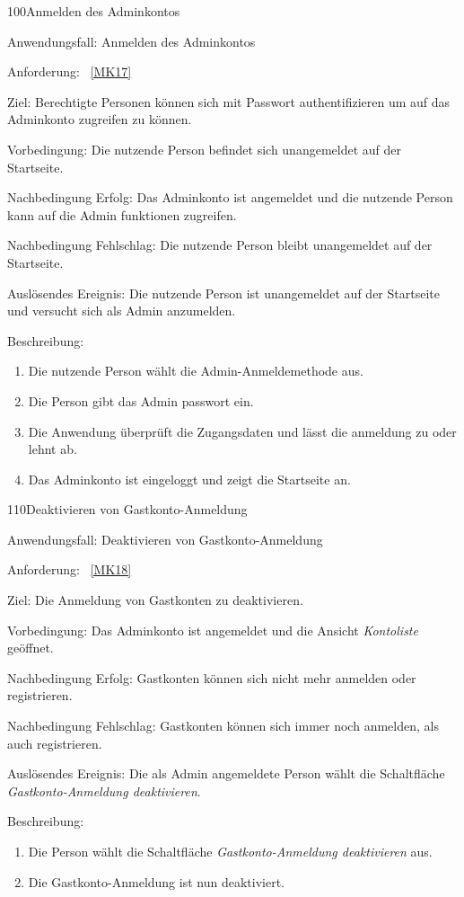 \begin{function}{100}{Anmelden des Adminkontos}
    \item[Anwendungsfall:] Anmelden des Adminkontos
    \item[Anforderung:]~\ref{MK17}
    \item[Ziel:] Berechtigte Personen können sich mit Passwort authentifizieren um auf das Adminkonto zugreifen zu können.
    \item[Vorbedingung:] Die nutzende Person befindet sich unangemeldet auf der Startseite.
    \item[Nachbedingung Erfolg:] Das Adminkonto ist angemeldet und die nutzende Person kann auf die Admin funktionen zugreifen.
    \item[Nachbedingung Fehlschlag:] Die nutzende Person bleibt unangemeldet auf der Startseite.
    \item[Auslösendes Ereignis:] Die nutzende Person ist unangemeldet auf der Startseite und versucht sich als Admin anzumelden.
    \item[Beschreibung:] ~
    \begin{enumerate}
        \item Die nutzende Person wählt die Admin-Anmeldemethode aus.
        \item Die Person gibt das Admin passwort ein.
        \item Die Anwendung überprüft die Zugangsdaten und lässt die anmeldung zu oder lehnt ab.
        \item Das Adminkonto ist eingeloggt und zeigt die Startseite an.
    \end{enumerate}
\end{function}

\pagebreak

\begin{function}{110}{Deaktivieren von Gastkonto-Anmeldung}
    \item[Anwendungsfall:] Deaktivieren von Gastkonto-Anmeldung
    \item[Anforderung:]~\ref{MK18}
    \item[Ziel:] Die Anmeldung von Gastkonten zu deaktivieren.
    \item[Vorbedingung:] Das Adminkonto ist angemeldet und die Ansicht \textit{Kontoliste} geöffnet.
    \item[Nachbedingung Erfolg:] Gastkonten können sich nicht mehr anmelden oder registrieren.
    \item[Nachbedingung Fehlschlag:] Gastkonten können sich immer noch anmelden, als auch registrieren.
    \item[Auslösendes Ereignis:] Die als Admin angemeldete Person wählt die Schaltfläche \textit{Gastkonto-Anmeldung deaktivieren}.
    \item[Beschreibung:] ~
    \begin{enumerate}
        \item Die Person wählt die Schaltfläche \textit{Gastkonto-Anmeldung deaktivieren} aus.
        \item Die Gastkonto-Anmeldung ist nun deaktiviert.
    \end{enumerate}
\end{function}

